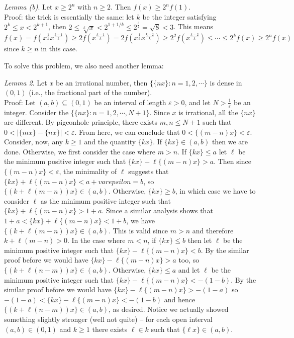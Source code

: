 \documentclass[11pt,a4paper]{article}
\newcommand{\<}{\langle}
\renewcommand{\>}{\rangle}
\begin{document}
\begin{enumerate}
    \emph{Lemma (b)}. Let $x\ge 2^n$ with $n\ge 2$. Then $f(x)\ge 2^nf(1)$. \\
    Proof: the trick is essentially the same: let $k$ be the integer satisfying $2^k\le x<2^{k+1}$, then $2\le \sqrt[k]{x}<2^{1+1/k}\le 2^{\frac{3}{2}}=\sqrt{8}<3$. This means 
    \[
    f(x)=f(x^{\frac{1}{k}}x^{\frac{k-1}{k}})\ge 2f(x^{\frac{k-1}{k}})
    =2f(x^{\frac{1}{k}}x^{\frac{k-2}{k}})\ge 2^2f(x^{\frac{k-2}{k}})
    \le\cdots \le 2^kf(x)\ge 2^nf(x)
    \]
    since $k\ge n$ in this case. 
    
    To solve this problem, we also need another lemma: 
    
    \emph{Lemma 2}. Let $x$ be an irrational number, then $\{\{nx\}: n = 1, 2, \cdots \}$ is dense in $(0, 1)$ (i.e., the fractional part of the number). \\
    Proof: Let $(a, b)\subseteq (0, 1)$ be an interval of length $\varepsilon>0$, and let $N>\frac{1}{\varepsilon}$ be an integer. 
    Consider the $\{\{nx\}: n = 1, 2, \cdots , N+1\}$. Since $x$ is irrational, all the $\{nx\}$ are different. By pigeonhole principle, there exists $m, n\le N+1$ such that $0<|\{mx\}-\{nx\}|<\varepsilon$. From here, we can conclude that $0<\{(m-n)x\}<\varepsilon$. 
    Consider, now, any $k\ge 1$ and the quantity $\{kx\}$. If $\{kx\}\in (a, b)$ then we are done. Otherwise, we first consider the case where $m>n$. If $\{kx\}\le a$ let $\ell$ be the minimum positive integer such that $\{kx\}+\ell\{(m-n)x\}>a$. Then since $\{(m-n)x\}<\varepsilon$, the minimality of $\ell$ suggests that $\{kx\}+\ell\{(m-n)x\}< a + varepsilon=b$, so $\{(k + \ell(m-n))x\}\in (a, b)$. 
    Otherwise, $\{kx\}\ge b$, in which case we have to consider $\ell$ as the minimum positive integer such that $\{kx\}+\ell\{(m-n)x\}> 1 + a$. Since a similar analysis shows that $1+a< \{kx\}+\ell\{(m-n)x\} < 1+b$, we have $\{(k + \ell(m-n))x\}\in (a, b)$. 
    This is valid since $m>n$ and therefore $k + \ell(m-n)>0$. 
    In the case where $m<n$, if $\{kx\}\le b$ then let $\ell$ be the minimum positive integer such that $\{kx\}-\ell\{(m-n)x\}<b$. By the similar proof before we would have $\{kx\}-\ell\{(m-n)x\} > a$ too, so $\{(k + \ell(n-m))x\}\in (a, b)$. 
    Otherwise, $\{kx\}\le a$ and let $\ell$ be the minimum positive integer such that $\{kx\}-\ell\{(m-n)x\} < -(1-b)$. By the similar proof before we would have $\{kx\}-\ell\{(m-n)x\} > -(1-a)$ so $-(1-a)<\{kx\}-\ell\{(m-n)x\} < -(1-b)$ and hence $\{(k + \ell(n-m))x\}\in (a, b)$, as desired. 
    Notice we actually showed something slightly stronger (well not quite) -- for each open interval $(a, b)\in (0, 1)$ and $k\ge 1$ there exists $\ell\in k$ such that $\{\ell x\}\in (a, b)$. 
    

\end{enumerate}
\end{document}
